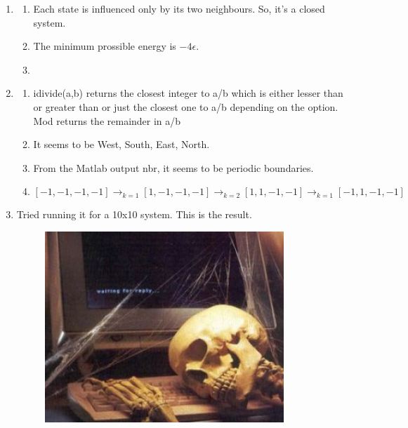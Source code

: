 \documentclass[letterpaper,12pt]{article}
\begin{document}
\begin{enumerate}
\item

\begin{enumerate}
\item Each state is influenced only by its two neighbours. So, it's a closed system.

\item
 The minimum prossible energy is  $-4  \epsilon$.

 \item


\end{enumerate}

\item
\begin{enumerate}

\item
idivide(a,b) returns the closest integer to a/b which is either lesser than or greater than or just the closest one to a/b depending on the option. Mod returns the remainder in a/b
\item It seems to be West, South, East, North.

\item From the Matlab output nbr, it seems to be periodic boundaries.
\item
\[[-1,-1,-1,-1] \to_{k=1} [1,-1,-1,-1] \to_{k=2} [1,1,-1,-1] \to_{k=1} [-1,1,-1,-1] \]

\end{enumerate}
\item

Tried running it for a 10x10 system. This is the result.

\begin{figure}[h!]
	\centering
	\includegraphics[width=9cm]{1hxny5.jpg}

\end{figure}

\end{enumerate}
\end{document}
